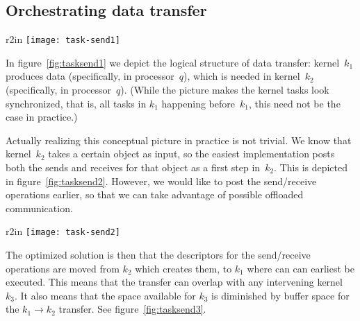 
\subsection{Orchestrating data transfer}

  \begin{wrapfigure}{r}{2in}
    \texttt{[image: task-send1]}
    \caption{Depiction of task $(k_1,q)$ sending data to $(k_2,p)$}
    \label{fig:tasksend1}
  \end{wrapfigure}
%
In figure~\ref{fig:tasksend1} we depict the logical structure of data
transfer: kernel~$k_1$ produces data (specifically, in processor~$q$), which is needed in
kernel~$k_2$ (specifically, in processor~$q$).
(While the picture makes the kernel tasks look synchronized, that is,
all tasks in $k_1$ happening before~$k_1$, this need not be the case
in practice.)

Actually realizing this conceptual picture in practice is not
trivial. We know that kernel~$k_2$ takes a certain object as input, so
the easiest implementation posts both the sends and receives for that
object as a first step in~$k_2$. This is depicted in
figure~\ref{fig:tasksend2}. However, we would like to post the
send/receive operations earlier, so that we can take advantage of
possible offloaded communication.

  \begin{wrapfigure}{r}{2in}
\texttt{[image: task-send2]}
  \caption{Data transfer as part of $k_2$}
  \label{fig:tasksend2}
\end{wrapfigure}
%
The optimized solution is then that the descriptors for the
send/receive operations are moved from $k_2$ which creates them, to
$k_1$ where can can earliest be executed. This means that the transfer
can overlap with any intervening kernel~$k_3$. It also means that the
space available for $k_3$ is diminished by buffer space for the
$k_1\rightarrow k_2$ transfer. See figure~\ref{fig:tasksend3}.

